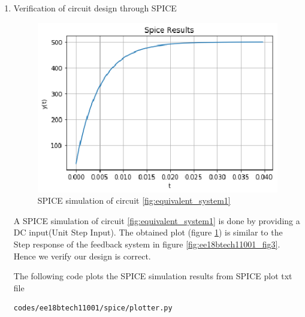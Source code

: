\begin{enumerate}[label=\arabic*.,ref=\theenumi]
\begin{table}[!ht]
\centering

\caption{Circuit Parameters}
\label{table:ee18btech11001_params2}
\end{table}

\item Verification of circuit design through SPICE

\begin{figure}[!ht]
\centering
    \includegraphics[width=\columnwidth]{./figs/ee18btech11001/Figure_4.eps}
  \caption{SPICE simulation of circuit \ref{fig:equivalent_system1}}
  \label{fig:ee18btech11001_fig5}
\end{figure}

A SPICE simulation of circuit \ref{fig:equivalent_system1} is done by providing a DC input(Unit Step Input). The obtained plot (figure \ref{fig:ee18btech11001_fig5}) is similar to the Step response of the feedback system in figure \ref{fig:ee18btech11001_fig3}. Hence we verify our design is correct.



The following code plots the SPICE simulation results
from SPICE plot txt file

\begin{lstlisting}
codes/ee18btech11001/spice/plotter.py
\end{lstlisting}
\end{enumerate}
